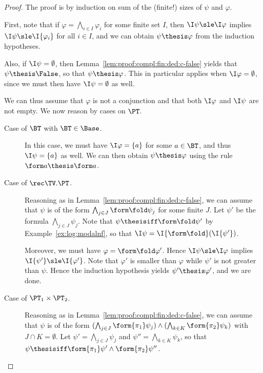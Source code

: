 \begin{proof}
The proof is by induction on sum of the (finite!) 
sizes of $\psi$ and $\varphi$.

First, note that if $\varphi = \bigwedge_{i \in I}\varphi_i$
for some finite set $I$,
then $\I\psi \sle \I\varphi$ implies
$\I\psi \sle \I{\varphi_i}$ for all $i \in I$,
and we can obtain $\psi \thesis \varphi$ from the induction hypotheses.

Also, if $\I\psi = \emptyset$, then Lemma~\ref{lem:proof:compl:fin:ded:c-false}
yields that $\psi \thesis \False$,
so that $\psi \thesis \varphi$.
This in particular applies when $\I\varphi = \emptyset$,
since we must then have $\I\psi = \emptyset$ as well.

We can thus assume that $\varphi$ is not a conjunction
and that both $\I\varphi$ and $\I\psi$ are not empty.
We now reason by cases on $\PT$.
\begin{description}
\item[Case of $\BT$ with $\BT \in \Base$.]
In this case, we must have $\I\varphi = \{a\}$ for some $a \in \BT$,
and thus $\I\psi = \{a\}$ as well.
We can then obtain $\psi \thesis \varphi$ using the rule $\form a \thesis \form a$.

\item[Case of $\rec\TV.\PT$.]
Reasoning as in Lemma~\ref{lem:proof:compl:fin:ded:c-false},
we can assume that $\psi$ is of the form
$\bigwedge_{j \in J}\form\fold \psi_j$ for some finite $J$.
Let $\psi'$ be the formula
$\bigwedge_{j \in J} \psi_j$.
Note that $\psi \thesisiff \form\fold\psi'$ by Example~\ref{ex:log:modalnf},
so that
$\I\psi = \I{\form\fold}(\I{\psi'})$.

Moreover, we must have $\varphi = \form\fold \varphi'$.
Hence $\I\psi \sle \I\varphi$
implies $\I{\psi'} \sle \I{\varphi'}$.
Note that $\varphi'$ is smaller than $\varphi$
while $\psi'$ is not greater than $\psi$.
Hence the induction hypothesis yields
$\psi' \thesis \varphi'$, and we are done.

\item[Case of $\PT_1 \times \PT_2$.]
Reasoning as in Lemma~\ref{lem:proof:compl:fin:ded:c-false},
we can assume that $\psi$ is of the form
\( 
  (\bigwedge_{j \in J} \form{\pi_1}\psi_j)
  \land
  (\bigwedge_{k \in K} \form{\pi_2}\psi_k)
\)
with $J \cap K = \emptyset$.
Let $\psi' = \bigwedge_{j \in J} \psi_j$
and $\psi'' = \bigwedge_{k \in K} \psi_k$,
so that $\psi \thesisiff \form{\pi_1}\psi' \land \form{\pi_2}\psi''$.


\end{description}
\end{proof}

